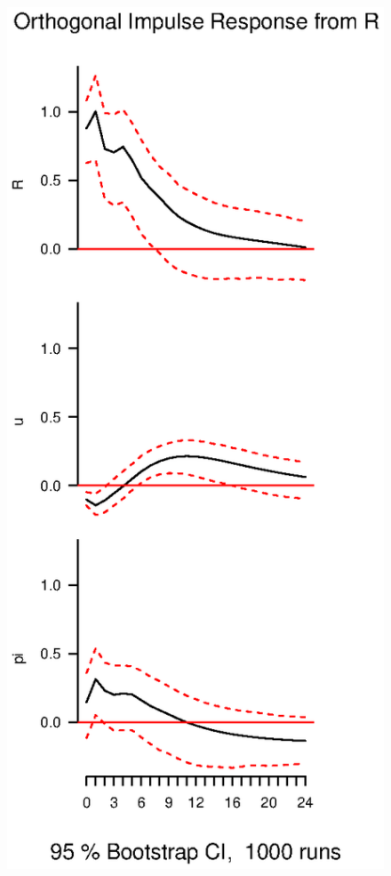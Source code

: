 \documentclass{beamer}
\begin{document}
\begin{frame}
  \begin{figure}
    \includegraphics[scale=.4]{interest_shock2.eps}
  \end{figure}
\end{frame}
\end{document}
